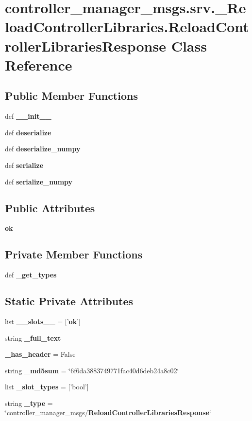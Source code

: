 \section{controller\-\_\-manager\-\_\-msgs.\-srv.\-\_\-\-Reload\-Controller\-Libraries.\-Reload\-Controller\-Libraries\-Response \-Class \-Reference}
\label{classcontroller__manager__msgs_1_1srv_1_1__ReloadControllerLibraries_1_1ReloadControllerLibrariesResponse}
\subsection*{\-Public \-Member \-Functions}
\begin{DoxyCompactItemize}
\item 
def {\bf \-\_\-\-\_\-init\-\_\-\-\_\-}
\item 
def {\bf deserialize}
\item 
def {\bf deserialize\-\_\-numpy}
\item 
def {\bf serialize}
\item 
def {\bf serialize\-\_\-numpy}
\end{DoxyCompactItemize}
\subsection*{\-Public \-Attributes}
\begin{DoxyCompactItemize}
\item 
{\bf ok}
\end{DoxyCompactItemize}
\subsection*{\-Private \-Member \-Functions}
\begin{DoxyCompactItemize}
\item 
def {\bf \-\_\-get\-\_\-types}
\end{DoxyCompactItemize}
\subsection*{\-Static \-Private \-Attributes}
\begin{DoxyCompactItemize}
\item 
list {\bf \-\_\-\-\_\-slots\-\_\-\-\_\-} = ['{\bf ok}']
\item 
string {\bf \-\_\-full\-\_\-text}
\item 
{\bf \-\_\-has\-\_\-header} = \-False
\item 
string {\bf \-\_\-md5sum} = \char`\"{}6f6da3883749771fac40d6deb24a8c02\char`\"{}
\item 
list {\bf \-\_\-slot\-\_\-types} = ['bool']
\item 
string {\bf \-\_\-type} = \char`\"{}controller\-\_\-manager\-\_\-msgs/{\bf \-Reload\-Controller\-Libraries\-Response}\char`\"{}
\end{DoxyCompactItemize}


